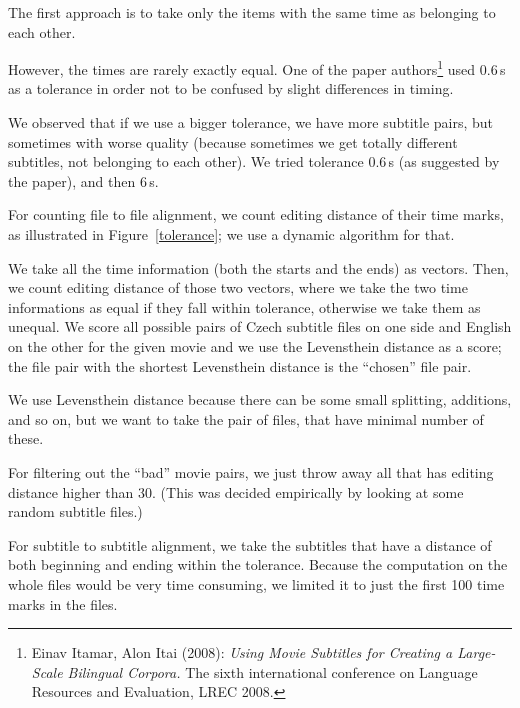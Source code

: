 The first approach is to take only the items with the same time as belonging to each other.

However, the times are rarely exactly equal. One of the paper authors\footnote{Einav Itamar, Alon Itai (2008): \emph{Using Movie Subtitles for Creating a Large-Scale Bilingual Corpora.} The sixth international conference on Language Resources and Evaluation, LREC 2008.} used 0.6\,s as a tolerance in order not to be confused by slight differences in timing.

We observed that if we use a bigger tolerance, we have more subtitle pairs, but sometimes with worse quality (because sometimes we get totally different subtitles, not belonging to each other). We tried tolerance 0.6\,s (as suggested by the paper), and then 6\,s.

For counting file to file alignment, we count editing distance of their time marks, as illustrated in Figure~\ref{tolerance}; we use a dynamic algorithm for that.

We take all the time information (both the starts and the ends) as vectors. Then, we count editing distance of those two vectors, where we take the two time informations as equal if they fall within tolerance, otherwise we take them as unequal. We score all possible pairs of Czech subtitle files on one side and English on the other for the given movie and we use the Levensthein distance as a score; the file pair with the shortest Levensthein distance is the ``chosen'' file pair.

We use Levensthein distance because there can be some small splitting, additions, and so on, but we want to take the pair of files, that have minimal number of these.

For filtering out the ``bad'' movie pairs, we just throw away all that has editing distance higher than 30. (This was decided empirically by looking at some random subtitle files.)

For subtitle to subtitle alignment, we take the subtitles that have a distance of both beginning and ending within the tolerance. Because the computation on the whole files would be very time consuming, we limited it to just the first 100 time marks in the files.


